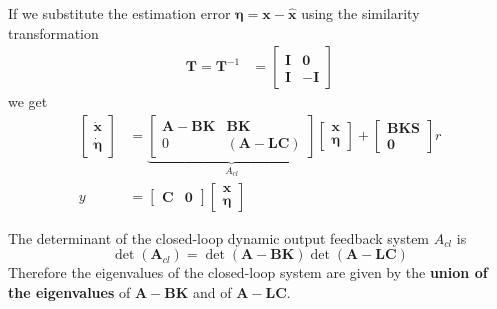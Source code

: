 If we substitute the estimation error $\bm{\eta}=\textbf{x}-\hat{\textbf{x}}$ using the similarity transformation
\begin{align*}
    \mathbf{T} =\mathbf{T}^{-1} & =\begin{bmatrix}
                                       \mathbf{I} & \mathbf{0}  \\
                                       \mathbf{I} & \mathbf{-I}
                                   \end{bmatrix}
\end{align*}
we get
\begin{align*}
    \begin{bmatrix}
        \dot{\mathbf{x}} \\
        \dot{\bm{\eta}}
    \end{bmatrix}
      & =
    \underbrace{
        \begin{bmatrix}
            \mathbf{A}-\mathbf{BK} & \mathbf{BK}              \\
            0                      & (\mathbf{A}-\mathbf{LC})
        \end{bmatrix}
    }_{A_{cl}}
    \begin{bmatrix}
        \mathbf{x} \\
        \bm{\eta}
    \end{bmatrix}
    +
    \begin{bmatrix}
        \mathbf{BKS} \\
        \mathbf{0}
    \end{bmatrix}
    r                             \\
    y & = \begin{bmatrix}
              \mathbf{C} & \mathbf{0}
          \end{bmatrix}
    \begin{bmatrix}
        \textbf{x} \\
        \bm{\eta}
    \end{bmatrix}
\end{align*}

The determinant of the closed-loop dynamic output feedback system $A_{cl}$ is
\begin{equation*}
    \det(\mathbf{A}_{cl})=\det(\mathbf{A}-\mathbf{BK})\det(\mathbf{A}-\mathbf{LC})
\end{equation*}
Therefore the eigenvalues of the closed-loop system are given by the \textbf{union of the eigenvalues} of $\mathbf{A}-\mathbf{BK}$ and of $\mathbf{A}-\mathbf{LC}$.
